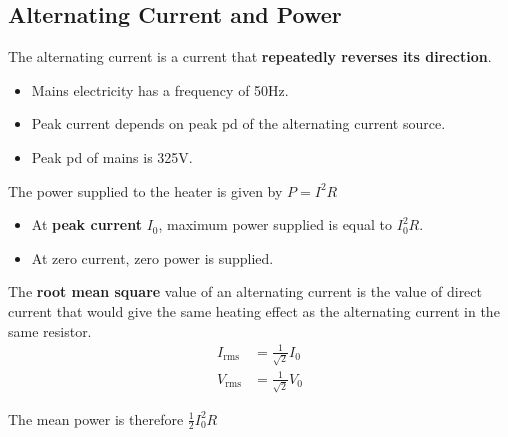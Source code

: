 \subsection{Alternating Current and Power}

The alternating current is a current that \textbf{repeatedly reverses its direction}.
\begin{itemize}
    \item Mains electricity has a frequency of 50Hz.
    \item Peak current depends on peak pd of the alternating current source.
    \item Peak pd of mains is 325V.
\end{itemize}

The power supplied to the heater is given by $P=I^2R$
\begin{itemize}
    \item At \textbf{peak current} $I_0$, maximum power supplied is equal to $I_0^2R$.
    \item At zero current, zero power is supplied.
\end{itemize}

The \textbf{root mean square} value of an alternating current is the value of direct current that would give the same heating effect as the alternating current in the same resistor.
\begin{align*}
    I_\text{rms}&=\frac{1}{\sqrt{2}}I_0\\
    V_\text{rms}&=\frac{1}{\sqrt{2}}V_0
\end{align*}

The mean power is therefore $\frac{1}{2}I_0^2R$

